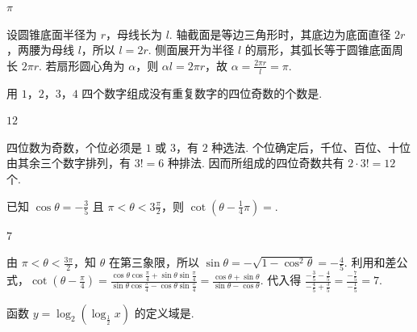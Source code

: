 \begin{answer}
\(\pi\)
\end{answer}

\begin{solution}
设圆锥底面半径为 \(r\)，母线长为 \(l\). 轴截面是等边三角形时，其底边为底面直径 \(2r\)，两腰为母线 \(l\)，所以 \(l=2r\). 侧面展开为半径 \(l\) 的扇形，其弧长等于圆锥底面周长 \(2\pi r\). 若扇形圆心角为 \(\alpha\)，则 \(\alpha l=2\pi r\)，故 \(\alpha=\frac{2\pi r}{l}=\pi\).
\end{solution}

\begin{problem}

用 \(1\)，\(2\)，\(3\)，\(4\) 四个数字组成没有重复数字的四位奇数的个数是\fillinblank{}.
\end{problem}

\begin{answer}
\(12\)
\end{answer}

\begin{solution}
四位数为奇数，个位必须是 \(1\) 或 \(3\)，有 \(2\) 种选法. 个位确定后，千位、百位、十位由其余三个数字排列，有 \(3!=6\) 种排法. 因而所组成的四位奇数共有 \(2\cdot3!=12\) 个.
\end{solution}

\begin{problem}

已知 \(\cos \theta = -\frac{3}{5}\) 且 \(\pi < \theta < 3\frac{\pi}{2}\)，则 \(\cot\left( \theta - \frac{1}{4}\pi \right) =\)\fillinblank{}.
\end{problem}

\begin{answer}
\(7\)
\end{answer}

\begin{solution}
由 \(\pi<\theta<\frac{3\pi}{2}\)，知 \(\theta\) 在第三象限，所以 \(\sin\theta=-\sqrt{1-\cos^2\theta}=-\frac45\). 利用和差公式，\(\cot\left(\theta-\frac{\pi}{4}\right)=\frac{\cos\theta\cos\frac{\pi}{4}+\sin\theta\sin\frac{\pi}{4}}{\sin\theta\cos\frac{\pi}{4}-\cos\theta\sin\frac{\pi}{4}}=\frac{\cos\theta+\sin\theta}{\sin\theta-\cos\theta}\). 代入得 \(\frac{-\frac35-\frac45}{-\frac45+\frac35}=\frac{-\frac75}{-\frac15}=7\).
\end{solution}

\begin{problem}

函数 \(y = \log_2\left(\log_{\frac{1}{2}}x\right) \) 的定义域是\fillinblank{}.
\end{problem}

